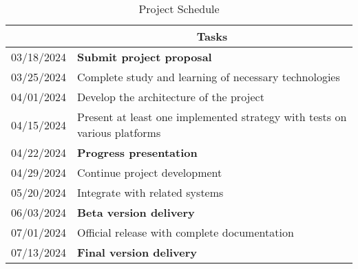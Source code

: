 \begin{table}[h]
    \centering
    \begin{tabular}{ |c|p{13cm}| }
        \hline
        \centering{\textbf{Date}} &
        \multicolumn{1}{c|}{\textbf{Tasks}}\\\hline
        03/18/2024 & \textbf{Submit project proposal} \\\hline
        03/25/2024 & Complete study and learning of necessary technologies \\\hline
        04/01/2024 & Develop the architecture of the project \\\hline
        04/15/2024 & Present at least one implemented strategy with tests on various platforms \\\hline
        04/22/2024 & \textbf{Progress presentation} \\\hline
        04/29/2024 & Continue project development \\\hline
        05/20/2024 & Integrate with related systems \\\hline
        06/03/2024 & \textbf{Beta version delivery} \\\hline
        07/01/2024 & Official release with complete documentation \\\hline
        07/13/2024 & \textbf{Final version delivery} \\\hline
    \end{tabular}
    \caption{Project Schedule}
    \label{tab:planning}
\end{table}
